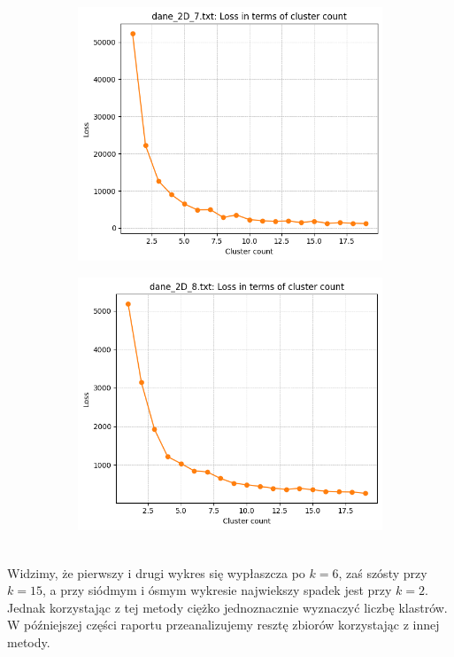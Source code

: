 \documentclass[polish,12pt,a4paper]{extarticle}
\begin{document}
\begin{figure}[h!]
    \hfill
    \vspace{}
    \begin{subfigure}[b]{0.30\textwidth}
        \includegraphics[width=\linewidth]{img/elbow/data7.png}
        \captionsetup{labelformat=empty}
    \end{subfigure}
    \begin{subfigure}[b]{0.30\textwidth}
        \includegraphics[width=\linewidth]{img/elbow/data8.png}
        \captionsetup{labelformat=empty}
    \end{subfigure}
    \label{fig:data_grid}
\end{figure} \\
\noindent Widzimy, że pierwszy i drugi wykres się wypłaszcza po $k = 6$, zaś szósty przy $k = 15$, a przy siódmym i ósmym wykresie najwiekszy spadek jest przy $k = 2$. Jednak korzystając z tej metody ciężko jednoznacznie wyznaczyć liczbę klastrów. W późniejszej części raportu przeanalizujemy resztę zbiorów korzystając z innej metody.
\end{document}
